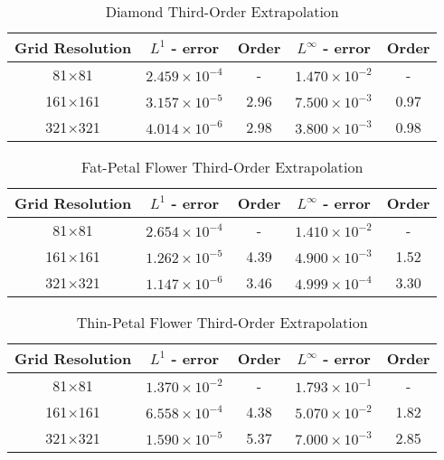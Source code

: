 \documentclass[oneside,12pt,final]{/Applications/TeX/packages/ucthesis-CA2012}
\begin{document}
\begin{mainmatter}
\begin{table} [!h]
\caption{Diamond Third-Order Extrapolation}
\centering
\begin{tabular}{c c c c c}
\hline
Grid Resolution & $L^1$ - error           & Order  & $L^{\infty}$ - error        & Order \\ \hline
81$\times$81     & $2.459 \times 10^{-4} $ &   -    & $1.470 \times 10^{-2} $  &  -    \\
161$\times$161   & $3.157 \times 10^{-5} $ &  2.96  & $7.500 \times 10^{-3}$   & 0.97  \\
321$\times$321   & $4.014 \times 10^{-6} $ &  2.98  & $3.800 \times 10^{-3}$   & 0.98  \\
\end{tabular}
\end{table}

\begin{table} [!h]
\caption{Fat-Petal Flower Third-Order Extrapolation}
\centering
\begin{tabular}{c c c c c}
\hline
Grid Resolution & $L^1$ - error           & Order  & $L^{\infty}$ - error        & Order \\ \hline
81$\times$81     & $2.654 \times 10^{-4}$  &   -    & $1.410 \times 10^{-2}$   &  -  \\
161$\times$161   & $1.262 \times 10^{-5}$  &  4.39  & $4.900 \times 10^{-3}$   & 1.52\\
321$\times$321   & $1.147 \times 10^{-6}$ &  3.46  & $4.999 \times 10^{-4} $  & 3.30\\
\end{tabular}
\end{table}


\begin{table} [!h]
\caption{Thin-Petal Flower Third-Order Extrapolation}
\centering
\begin{tabular}{c c c c c}
\hline
Grid Resolution & $L^1$ - error           & Order  & $L^{\infty}$ - error        & Order \\ \hline
81$\times$81     & $1.370 \times 10^{-2}$  &   -    & $1.793 \times 10^{-1}   $ &  -    \\
161$\times$161   & $6.558 \times 10^{-4}$  &  4.38  & $5.070 \times 10^{-2}  $ & 1.82  \\
321$\times$321   & $1.590 \times 10^{-5}$  &  5.37  & $7.000 \times 10^{-3}$   & 2.85  \\
\end{tabular}
\end{table}


\end{mainmatter}
\end{document}
